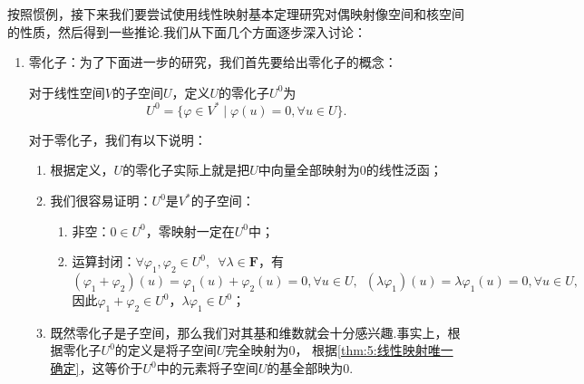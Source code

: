 按照惯例，接下来我们要尝试使用线性映射基本定理研究对偶映射像空间和核空间的性质，然后得到一些推论.我们从下面几个方面逐步深入讨论：
\begin{enumerate}
    \item 零化子：为了下面进一步的研究，我们首先要给出零化子的概念：
    \begin{definition}
        对于线性空间$V$的子空间$U$，定义$U$的零化子$U^0$为
        \[U^0=\{\varphi\in V^*\mid\varphi(u)=0,\forall u\in U\}.\]
    \end{definition}
    对于零化子，我们有以下说明：
    \begin{enumerate}
        \item 根据定义，$U$的零化子实际上就是把$U$中向量全部映射为0的线性泛函；
        \item 我们很容易证明：$U^0$是$V^*$的子空间：
        \begin{enumerate}
            \item 非空：$0\in U^0$，零映射一定在$U^0$中；
            \item 运算封闭：$\forall\varphi_1,\varphi_2\in U^0,\enspace \forall\lambda\in\mathbf{F}$，有
            \[(\varphi_1+\varphi_2)(u)=\varphi_1(u)+\varphi_2(u)=0,\forall u\in U,\enspace (\lambda\varphi_1)(u)=\lambda\varphi_1(u)=0,\forall u\in U,\]
            因此$\varphi_1+\varphi_2\in U^0$，$\lambda\varphi_1\in U^0$；
        \end{enumerate}
        \item 既然零化子是子空间，那么我们对其基和维数就会十分感兴趣.事实上，根据零化子$U^0$的定义是将子空间$U$完全映射为0，
        根据\autoref{thm:5:线性映射唯一确定}，这等价于$U^0$中的元素将子空间$U$的基全部映为0.


\end{enumerate}
\end{enumerate}
